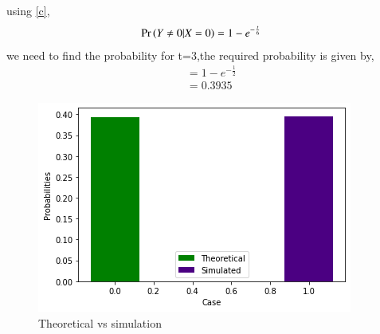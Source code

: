 \documentclass[journal,12pt,twocolumn]{IEEEtran}
\begin{document}
using \eqref{c},
\begin{align}
\Pr\left(Y\neq 0|X=0\right)&=1- e^{-\frac{t}{6}}
\end{align}
we need to find the probability for t=3,the required probability is given by,
\begin{align}
&=1- e^{-\frac{1}{2}}\\
&=0.3935
\end{align}
\begin{figure}[ht]
    \centering
    \includegraphics[width=\columnwidth]{assign_9.png}
    \caption{Theoretical vs simulation}
\label{fig_1}
\end{figure}
\end{document}
